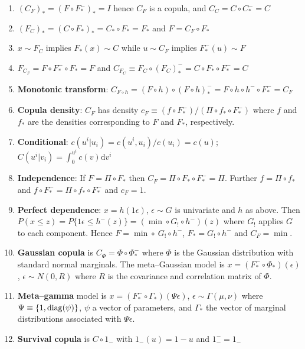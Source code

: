 \documentclass[useAMS,usenatbib,referee]{article}
\newcommand{\eps}{\epsilon}
\newcommand{\diag}{{\rm diag}}
\newcommand{\de}{\mathrm{d}}
\begin{document}
\begin{enumerate}
\item $(C_F)_*=(F\circ F_*^-)_*= I$ hence $C_F$ is a copula,  and $C_C=C\circ C_*^- =  C$
\item $(F_C)_*=(C\circ F_*)_*= C_*\circ F_*=F_*$ and $F=C_F\circ F_*$
\item $x\sim F_C$ implies $F_*(x)\sim C$ while $u\sim C_F$ implies $F_*^-(u)\sim F$
\item $ F_{C_F} =F\circ F_*^-\circ F_*=F$ and $C_{F_C}\equiv F_C\circ (F_C)_*^-=C\circ F_*\circ  F_*^-=C$ 
\item  {\bf Monotonic transform}: $C_{F\circ h}=(F\circ h) \circ (F\circ h)_*^- = F\circ h\circ h^- \circ F_*^- = C_F$
    \item {\bf Copula density}: $C_F$ has density
    $
   c_F\equiv (f\circ F_*^-)/(\Pi \circ f_*\circ F_*^-)
    $
    where $f$ and $f_*$ are the densities  corresponding to $F$ and $F_*$, respectively.  
    
      \item {\bf Conditional}: $c(u^i|u_i) = c(u^i,u_i)/c(u_i) = c(u)$;  
$
C(u^i|v_i)=\int_0^{u^i} c(v)\de v^i 
$

 \item {\bf Independence}:  If $F=\Pi\circ F_*$  then $C_F=\Pi\circ F_*\circ F_*^-=\Pi$.  Further $f=\Pi\circ f_*$ and $f\circ F_*^-=\Pi\circ f_*\circ F_*^-$ and $c_F=1$.
 
 
 \item  {\bf Perfect dependence}: $x=h(1\eps)$, $\eps\sim G$ is univariate and $h$ as above.    Then 
 $
 P(x\le z)=P\{1\eps\le h^-(z)\} = (\min\circ G_!\circ h^-)(z)
 $ 
 where $G_!$ applies $G$ to each component.    Hence $F=\min \circ\ G_!\circ h^-$,  $F_*=G_!\circ h^- $  and  $C_F=\min $.
 
    \item  {\bf Gaussian copula} is $C_{\Phi}=\Phi\circ \Phi_*^-$ where $\Phi$ is the Gaussian distribution with standard normal marginals.   The meta--Gaussian model is
$
 x=(F_*^-\circ \Phi_*) (\eps)$, $\eps\sim N(0,R)$ where $R$ is the covariance and correlation matrix of $\Phi$.
\item {\bf Meta--gamma} model  is
$
x = (F_*^-\circ\Gamma_*)(\Psi\eps)$, $\eps \sim \Gamma(\mu,\nu)
$
where  $\Psi\equiv\{1,\diag(\psi)\}$, $\psi$ a vector of parameters,  and $\Gamma_*$ the vector of marginal distributions associated with $\Psi\eps$.


\item {\bf Survival copula} is $C\circ 1_-$ with $1_-(u)=1-u$ and $1_-^-=1_-$


\end{enumerate}
\end{document}
